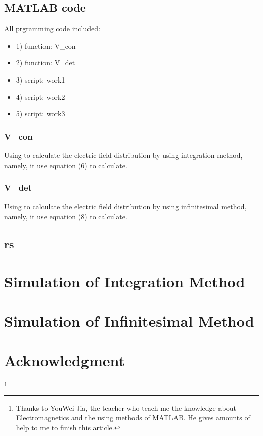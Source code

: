 \documentclass[10pt, journal, final]{IEEEtran}
\begin{document}
\subsection{
    MATLAB code
}
\label{code}
All prgramming code included:
\begin{itemize}
    \item 1) function: V\_con
    \item 2) function: V\_det
    \item 3) script: work1
    \item 4) script: work2
    \item 5) script: work3
\end{itemize}

\subsubsection*{
    V\_con
}
\label{V_con}
Using to calculate the electric field distribution
by using integration method, namely, it use equation (6) to calculate.

\subsubsection*{
    V\_det
}
\label{V_det}
Using to calculate the electric field distribution
by using infinitesimal method, namely, it use equation (8) to calculate.


\subsection{rs}


\section{
  Simulation of Integration Method
 }
\section{
  Simulation of Infinitesimal Method
 }
\section*{Acknowledgment}
\thanks{
    Thanks to YouWei Jia, the teacher who teach me the knowledge about Electromagnetics
    and the using methods of MATLAB. He gives amounts of help to me to finish this article.
}
\end{document}

